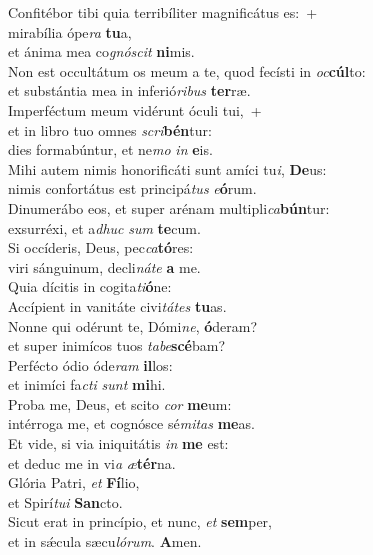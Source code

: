 \oddverse Confitébor tibi quia terribíliter magnificátus es:~+\\
\oddverse  mirabília ópe\textit{ra} \textbf{tu}a,~\*\\
\oddverse et ánima mea co\textit{gnó}\textit{scit} \textbf{ni}mis.\\
\evenverse Non est occultátum os meum a te, quod fecísti in \textit{oc}\textbf{cúl}to:~\*\\
\evenverse et substántia mea in inferió\textit{ri}\textit{bus} \textbf{ter}ræ.\\
\oddverse Imperféctum meum vidérunt óculi tui,~+\\
\oddverse  et in libro tuo omnes \textit{scri}\textbf{bén}tur:~\*\\
\oddverse dies formabúntur, et ne\textit{mo} \textit{in} \textbf{e}is.\\
\evenverse Mihi autem nimis honorificáti sunt amíci tu\textit{i}, \textbf{De}us:~\*\\
\evenverse nimis confortátus est principá\textit{tus} \textit{e}\textbf{ó}rum.\\
\oddverse Dinumerábo eos, et super arénam multipli\textit{ca}\textbf{bún}tur:~\*\\
\oddverse exsurréxi, et a\textit{dhuc} \textit{sum} \textbf{te}cum.\\
\evenverse Si occíderis, Deus, pec\textit{ca}\textbf{tó}res:~\*\\
\evenverse viri sánguinum, decli\textit{ná}\textit{te} \textbf{a} me.\\
\oddverse Quia dícitis in cogita\textit{ti}\textbf{ó}ne:~\*\\
\oddverse Accípient in vanitáte civi\textit{tá}\textit{tes} \textbf{tu}as.\\
\evenverse Nonne qui odérunt te, Dómi\textit{ne}, \textbf{ó}deram?~\*\\
\evenverse et super inimícos tuos \textit{ta}\textit{be}\textbf{scé}bam?\\
\oddverse Perfécto ódio óde\textit{ram} \textbf{il}los:~\*\\
\oddverse et inimíci fa\textit{cti} \textit{sunt} \textbf{mi}hi.\\
\evenverse Proba me, Deus, et scito \textit{cor} \textbf{me}um:~\*\\
\evenverse intérroga me, et cognósce sé\textit{mi}\textit{tas} \textbf{me}as.\\
\oddverse Et vide, si via iniquitátis \textit{in} \textbf{me} est:~\*\\
\oddverse et deduc me in vi\textit{a} \textit{æ}\textbf{tér}na.\\
\evenverse Glória Patri, \textit{et} \textbf{Fí}lio,~\*\\
\evenverse et Spirí\textit{tu}\textit{i} \textbf{San}cto.\\
\oddverse Sicut erat in princípio, et nunc, \textit{et} \textbf{sem}per,~\*\\
\oddverse et in sǽcula sæcu\textit{ló}\textit{rum}. \textbf{A}men.\\
